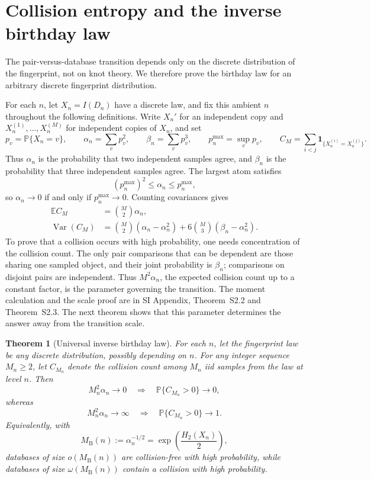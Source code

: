 \documentclass[9pt,twoside]{pnas-new}
\newtheorem{theorem}{Theorem}
\theoremstyle{definition}
\theoremstyle{remark}
\renewcommand{\Pr}{\mathbb{P}}
\newcommand{\SILocation}[1]{SI Appendix, #1}
\newcommand{\SIExactCollisionCalculus}{Theorem~S2.2}
\newcommand{\SIUniversalBirthdayLaw}{Theorem~S2.3}
\begin{document}
\section{Collision entropy and the inverse birthday law}
\label{sec:birthday-law}
The pair-versus-database transition depends only on the discrete distribution of the fingerprint, not on knot theory. We therefore prove the birthday law for an arbitrary discrete fingerprint distribution.

For each $n$, let $X_n=I(D_n)$ have a discrete law, and fix this ambient $n$ throughout the following definitions.  Write $X_n'{}$ for an independent copy and $X_n^{(1)},\ldots,X_n^{(M)}$ for independent copies of $X_n$, and set
\[
 p_v=\Pr\{X_n=v\},
 \qquad
 \alpha_n=\sum_vp_v^2,
 \qquad
 \beta_n=\sum_vp_v^3,
 \qquad
 p_n^{\max}=\sup_v p_v,
 \qquad
 C_M=\sum_{i<j}\mathbf 1_{\{X_n^{(i)}=X_n^{(j)}\}}.
\]
Thus $\alpha_n$ is the probability that two independent samples agree, and $\beta_n$ is the probability that three independent samples agree. The largest atom satisfies
\[
 (p_n^{\max})^2\le \alpha_n\le p_n^{\max},
\]
so $\alpha_n\to0$ if and only if $p_n^{\max}\to0$. Counting covariances gives
\begin{align*}
 \mathbb E C_M
 &=\binom M2\alpha_n,\\
 \operatorname{Var}(C_M)
 &=\binom M2(\alpha_n-\alpha_n^2)
   +6\binom M3(\beta_n-\alpha_n^2).
\end{align*}
To prove that a collision occurs with high probability, one needs concentration of the collision count. The only pair comparisons that can be dependent are those sharing one sampled object, and their joint probability is $\beta_n$; comparisons on disjoint pairs are independent. Thus $M^2\alpha_n$, the expected collision count up to a constant factor, is the parameter governing the transition. The moment calculation and the scale proof are in \SILocation{\SIExactCollisionCalculus{} and \SIUniversalBirthdayLaw{}}. The next theorem shows that this parameter determines the answer away from the transition scale.

\begin{theorem}[Universal inverse birthday law]\label{thm:inverse-birthday}
For each $n$, let the fingerprint law be any discrete distribution, possibly depending on $n$.  For any integer sequence $M_n\ge2$, let $C_{M_n}$ denote the collision count among $M_n$ iid samples from the law at level $n$.  Then
\[
 M_n^2\alpha_n\longrightarrow0
 \quad\Longrightarrow\quad
 \Pr\{C_{M_n}>0\}\longrightarrow0,
\]
whereas
\[
 M_n^2\alpha_n\longrightarrow\infty
 \quad\Longrightarrow\quad
 \Pr\{C_{M_n}>0\}\longrightarrow1.
\]
Equivalently, with
\[
 M_{\mathrm B}(n):=\alpha_n^{-1/2}
 =\exp\!\left(\frac{H_2(X_n)}{2}\right),
\]
databases of size $o(M_{\mathrm B}(n))$ are collision-free with high probability, while databases of size $\omega(M_{\mathrm B}(n))$ contain a collision with high probability.
\end{theorem}
\end{document}
